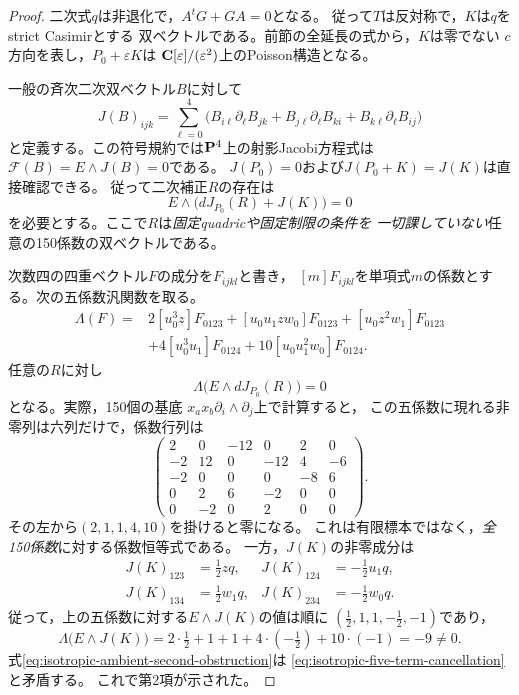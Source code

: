 \begin{proof}
二次式$q$は非退化で，$A^tG+GA=0$となる。
従って$T$は反対称で，$K$は$q$をstrict Casimirとする
双ベクトルである。前節の全延長の式から，$K$は零でない
$c$方向を表し，$P_0+\varepsilon K$は
$\mathbf C[\varepsilon]/(\varepsilon^2)$上のPoisson構造となる。

一般の斉次二次双ベクトル$B$に対して
\[
 J(B)_{ijk}=\sum_{\ell=0}^4
 \bigl(B_{i\ell}\partial_\ell B_{jk}
 +B_{j\ell}\partial_\ell B_{ki}
 +B_{k\ell}\partial_\ell B_{ij}\bigr)
\]
と定義する。この符号規約では$\mathbf P^4$上の射影Jacobi方程式は
$\mathcal F(B)=E\wedge J(B)=0$である。
$J(P_0)=0$および$J(P_0+K)=J(K)$は直接確認できる。
従って二次補正$R$の存在は
\begin{equation}
 E\wedge\bigl(dJ_{P_0}(R)+J(K)\bigr)=0
 \label{eq:isotropic-ambient-second-obstruction}
\end{equation}
を必要とする。ここで$R$は\emph{固定quadricや固定制限の条件を
一切課していない}任意の150係数の双ベクトルである。

\noindent
次数四の四重ベクトル$F$の成分を$F_{ijkl}$と書き，
$[m]F_{ijkl}$を単項式$m$の係数とする。次の五係数汎関数を取る。
\[
\begin{split}
 \Lambda(F)={}&2[u_0^3z]F_{0123}
 +[u_0u_1zw_0]F_{0123}+[u_0z^2w_1]F_{0123}\\
 &+4[u_0^3u_1]F_{0124}
 +10[u_0u_1^2w_0]F_{0124}.
\end{split}
\]
任意の$R$に対し
\begin{equation}
 \Lambda\bigl(E\wedge dJ_{P_0}(R)\bigr)=0
 \label{eq:isotropic-five-term-cancellation}
\end{equation}
となる。実際，150個の基底
$x_ax_b\partial_i\wedge\partial_j$上で計算すると，
この五係数に現れる非零列は六列だけで，係数行列は
\[
\begin{pmatrix}
 2&0&-12&0&2&0\\
 -2&12&0&-12&4&-6\\
 -2&0&0&0&-8&6\\
 0&2&6&-2&0&0\\
 0&-2&0&2&0&0
\end{pmatrix}.
\]
その左から$(2,1,1,4,10)$を掛けると零になる。
これは有限標本ではなく，\emph{全150係数}に対する係数恒等式である。
一方，$J(K)$の非零成分は
\[
\begin{aligned}
 J(K)_{123}&=\tfrac12zq,&
 J(K)_{124}&=-\tfrac12u_1q,\\
 J(K)_{134}&=\tfrac12w_1q,&
 J(K)_{234}&=-\tfrac12w_0q.
\end{aligned}
\]
従って，上の五係数に対する$E\wedge J(K)$の値は順に
$(\frac12,1,1,-\frac12,-1)$であり，
\[
 \Lambda\bigl(E\wedge J(K)\bigr)
 =2\cdot\tfrac12+1+1+4\cdot(-\tfrac12)+10\cdot(-1)=-9\ne0.
\]
式\eqref{eq:isotropic-ambient-second-obstruction}は
\eqref{eq:isotropic-five-term-cancellation}と矛盾する。
これで第2項が示された。


\end{proof}

